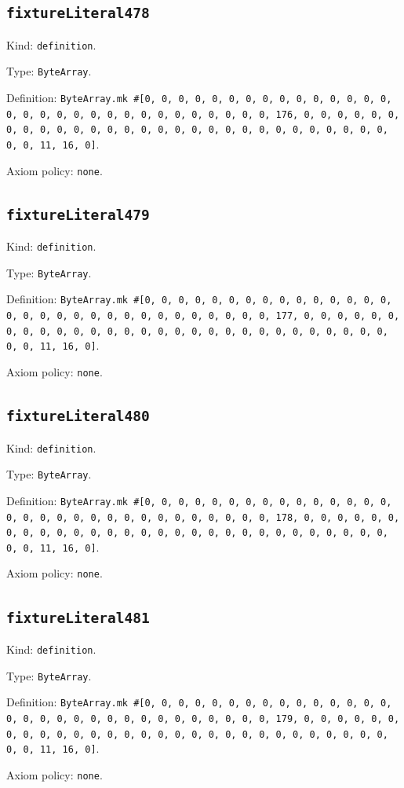 \documentclass[11pt]{article}
\begin{document}
\subsection*{\texttt{fixtureLiteral478}}
\noindent Kind: \texttt{definition}.\par
\noindent Type: \texttt{ByteArray}.\par
\noindent Definition: \texttt{ByteArray.mk \#[0, 0, 0, 0, 0, 0, 0, 0, 0, 0, 0, 0, 0, 0, 0, 0, 0, 0, 0, 0, 0, 0, 0, 0, 0, 0, 0, 0, 0, 0, 0, 176, 0, 0, 0, 0, 0, 0, 0, 0, 0, 0, 0, 0, 0, 0, 0, 0, 0, 0, 0, 0, 0, 0, 0, 0, 0, 0, 0, 0, 0, 0, 0, 11, 16, 0]}.\par
\noindent Axiom policy: \texttt{none}.\par
\subsection*{\texttt{fixtureLiteral479}}
\noindent Kind: \texttt{definition}.\par
\noindent Type: \texttt{ByteArray}.\par
\noindent Definition: \texttt{ByteArray.mk \#[0, 0, 0, 0, 0, 0, 0, 0, 0, 0, 0, 0, 0, 0, 0, 0, 0, 0, 0, 0, 0, 0, 0, 0, 0, 0, 0, 0, 0, 0, 0, 177, 0, 0, 0, 0, 0, 0, 0, 0, 0, 0, 0, 0, 0, 0, 0, 0, 0, 0, 0, 0, 0, 0, 0, 0, 0, 0, 0, 0, 0, 0, 0, 11, 16, 0]}.\par
\noindent Axiom policy: \texttt{none}.\par
\subsection*{\texttt{fixtureLiteral480}}
\noindent Kind: \texttt{definition}.\par
\noindent Type: \texttt{ByteArray}.\par
\noindent Definition: \texttt{ByteArray.mk \#[0, 0, 0, 0, 0, 0, 0, 0, 0, 0, 0, 0, 0, 0, 0, 0, 0, 0, 0, 0, 0, 0, 0, 0, 0, 0, 0, 0, 0, 0, 0, 178, 0, 0, 0, 0, 0, 0, 0, 0, 0, 0, 0, 0, 0, 0, 0, 0, 0, 0, 0, 0, 0, 0, 0, 0, 0, 0, 0, 0, 0, 0, 0, 11, 16, 0]}.\par
\noindent Axiom policy: \texttt{none}.\par
\subsection*{\texttt{fixtureLiteral481}}
\noindent Kind: \texttt{definition}.\par
\noindent Type: \texttt{ByteArray}.\par
\noindent Definition: \texttt{ByteArray.mk \#[0, 0, 0, 0, 0, 0, 0, 0, 0, 0, 0, 0, 0, 0, 0, 0, 0, 0, 0, 0, 0, 0, 0, 0, 0, 0, 0, 0, 0, 0, 0, 179, 0, 0, 0, 0, 0, 0, 0, 0, 0, 0, 0, 0, 0, 0, 0, 0, 0, 0, 0, 0, 0, 0, 0, 0, 0, 0, 0, 0, 0, 0, 0, 11, 16, 0]}.\par
\noindent Axiom policy: \texttt{none}.\par
\end{document}
